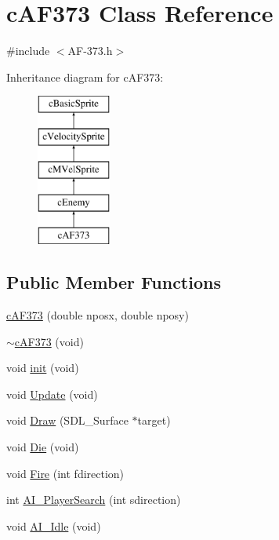 \hypertarget{classc_a_f373}{\section{c\-A\-F373 Class Reference}
\label{classc_a_f373}
}


{\ttfamily \#include $<$A\-F-\/373.\-h$>$}

Inheritance diagram for c\-A\-F373\-:\begin{figure}[H]
\begin{center}
\leavevmode
\includegraphics[height=5.000000cm]{classc_a_f373}
\end{center}
\end{figure}
\subsection*{Public Member Functions}
\begin{DoxyCompactItemize}
\item 
\hyperlink{classc_a_f373_ad1e010b3a5e419ad7d408667529e1c66}{c\-A\-F373} (double nposx, double nposy)
\item 
\hyperlink{classc_a_f373_a3c8a190ad1d09df42a02121023afd0f4}{$\sim$c\-A\-F373} (void)
\item 
void \hyperlink{classc_a_f373_af45007e3095690f46e0b741650b3829c}{init} (void)
\item 
void \hyperlink{classc_a_f373_acbc4a7495a52eeeac9f25fd09b390173}{Update} (void)
\item 
void \hyperlink{classc_a_f373_afecf71a620a3a1a0cd65c298527e574c}{Draw} (S\-D\-L\-\_\-\-Surface $\ast$target)
\item 
void \hyperlink{classc_a_f373_a246b6884baae7e13033749f1aa456dc9}{Die} (void)
\item 
void \hyperlink{classc_a_f373_af50876922f41b71690754973792fd5fe}{Fire} (int fdirection)
\item 
int \hyperlink{classc_a_f373_a2600986414d9d5e46fa3705064a49965}{A\-I\-\_\-\-Player\-Search} (int sdirection)
\item 
void \hyperlink{classc_a_f373_ad0fb3ef25506c23d026826847b663453}{A\-I\-\_\-\-Idle} (void)
\end{DoxyCompactItemize}

